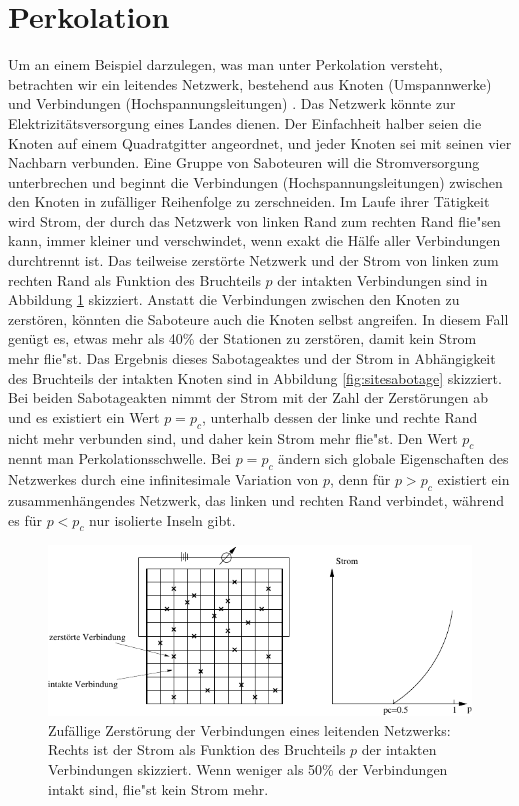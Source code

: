 \section{Perkolation}
Um an einem Beispiel darzulegen, was man unter Perkolation versteht, betrachten wir ein leitendes Netzwerk, bestehend aus Knoten (Umspannwerke) und Verbindungen (Hochspannungsleitungen) \cite{Zallen:83}. Das Netzwerk k\"onnte zur Elektrizit\"atsversorgung eines Landes dienen. Der Einfachheit halber seien die Knoten auf einem Quadratgitter angeordnet, und jeder Knoten sei mit seinen vier Nachbarn verbunden. Eine Gruppe von Saboteuren will die Stromversorgung unterbrechen und beginnt die Verbindungen (Hochspannungsleitungen) zwischen den Knoten in zuf\"alliger Reihenfolge zu zerschneiden. Im Laufe ihrer T\"atigkeit wird Strom, der durch das Netzwerk von linken Rand zum rechten Rand flie"sen kann, immer kleiner und verschwindet, wenn exakt die H\"alfe aller Verbindungen durchtrennt ist. Das teilweise zerst\"orte Netzwerk und der Strom von linken zum rechten Rand als Funktion des Bruchteils $p$ der intakten Verbindungen sind in Abbildung \ref{fig:bondsabotage} skizziert. Anstatt die Verbindungen zwischen den Knoten zu zerst\"oren, k\"onnten die Saboteure auch die Knoten selbst angreifen. In diesem Fall gen\"ugt es, etwas mehr als 40\% der Stationen zu zerst\"oren, damit kein Strom mehr flie"st. Das Ergebnis dieses Sabotageaktes und der Strom in Abh\"angigkeit des Bruchteils der intakten Knoten sind in  Abbildung \ref{fig:sitesabotage} skizziert. Bei beiden Sabotageakten nimmt der Strom mit der Zahl der Zerst\"orungen ab und es existiert ein Wert $p=p_c$, unterhalb dessen der linke und rechte Rand nicht mehr verbunden sind, und daher kein Strom mehr flie"st. Den Wert $p_c$ nennt man Perkolationsschwelle. Bei $p=p_c$ \"andern sich globale Eigenschaften des Netzwerkes durch eine infinitesimale Variation von $p$, denn f\"ur $p>p_c$ existiert ein zusammenh\"angendes Netzwerk, das linken und rechten Rand verbindet, w\"ahrend es f\"ur $p<p_c$ nur isolierte Inseln gibt. 
\begin{figure}[tbp]
  \centering
  \includegraphics{./Einleitung-figs/sabobond}
  \caption{Zuf\"allige Zerst\"orung der Verbindungen eines leitenden Netzwerks: Rechts ist der Strom als Funktion des Bruchteils $p$ der intakten Verbindungen skizziert. Wenn weniger als 50\% der Verbindungen intakt sind, flie"st kein Strom mehr.}
  \label{fig:bondsabotage}
\end{figure}
